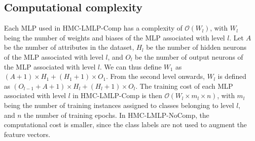 %

\subsection{Computational complexity}

Each MLP used in HMC-LMLP-Comp has a complexity of $\mathcal{O}(W_l)$, with $W_l$ being the number of weights and biases of the MLP associated with level $l$. Let $A$ be the number of attributes in the dataset, $H_l$ be the number of hidden neurons of the MLP associated with level $l$, and $O_l$ be the number of output neurons of the MLP associated with level $l$. We can thus define $W_1$ as $(A + 1) \times H_1 + (H_1 + 1) \times O_1$. From the second level onwards, $W_l$ is defined as $(O_{l-1} + A + 1) \times H_l + (H_l + 1) \times O_l$. The training cost of each MLP associated with level $l$ in HMC-LMLP-Comp is then $\mathcal{O}(W_l \times m_l \times n)$, with $m_l$ being the number of training instances assigned to classes belonging to level $l$, and $n$ the number of training epochs. In HMC-LMLP-NoComp, the computational cost is smaller, since the class labels are not used to augment the feature vectors.